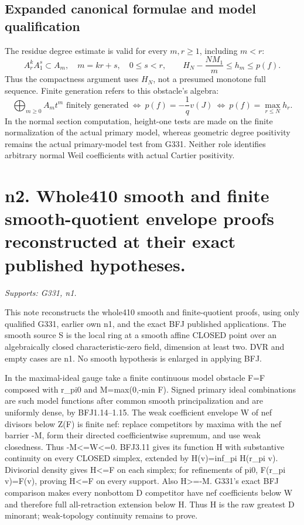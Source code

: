 \documentclass[11pt]{article}
\begin{document}
\subsection*{Expanded canonical formulae and model qualification}
The residue degree estimate is valid for every $m,r\ge1$, including $m<r$:
\[
 A_r^kA_1^s\subset A_m,\quad m=kr+s,\quad0\le s<r,
 \qquad H_N-\frac{NM_1}{m}\le h_m\le p(f).
\]
Thus the compactness argument uses $H_N$, not a presumed monotone full
sequence.  Finite generation refers to this obstacle's algebra:
\[
 \bigoplus_{m\ge0}A_mt^m\text{ finitely generated}
 \ \Longleftrightarrow\ p(f)=-\frac1qv(J)
 \ \Longleftrightarrow\ p(f)=\max_{r\le N}h_r.
\]
In the normal section computation, height-one tests are made on the
finite normalization of the actual primary model, whereas geometric degree
positivity remains the actual primary-model test from G331.  Neither role
identifies arbitrary normal Weil coefficients with actual Cartier positivity.


\section{n2. Whole410 smooth and finite smooth-quotient envelope proofs reconstructed at their exact published hypotheses.}
\textit{Supports: G331, n1.}

This note reconstructs the whole410 smooth and finite-quotient proofs, using only qualified G331, earlier own n1, and the exact BFJ published applications. The smooth source S is the local ring at a smooth affine CLOSED point over an algebraically closed characteristic-zero field, dimension at least two. DVR and empty cases are n1. No smooth hypothesis is enlarged in applying BFJ.

In the maximal-ideal gauge take a finite continuous model obstacle F=F composed with r\_pi0 and M=max(0,-min F). Signed primary ideal combinations are such model functions after common smooth principalization and are uniformly dense, by BFJ1.14--1.15. The weak coefficient envelope W of nef divisors below Z(F) is finite nef: replace competitors by maxima with the nef barrier -M, form their directed coefficientwise supremum, and use weak closedness. Thus -M\textless{}=W\textless{}=0. BFJ3.11 gives its function H with substantive continuity on every CLOSED simplex, extended by H(v)=inf\_pi H(r\_pi v). Divisorial density gives H\textless{}=F on each simplex; for refinements of pi0, F(r\_pi v)=F(v), proving H\textless{}=F on every support. Also H\textgreater{}=-M. G331's exact BFJ comparison makes every nonbottom D competitor have nef coefficients below W and therefore full all-retraction extension below H. Thus H is the raw greatest D minorant; weak-topology continuity remains to prove.
\end{document}
